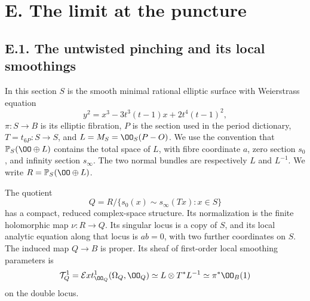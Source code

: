 \section{E. The limit at the puncture}
\subsection{E.1. The untwisted pinching and its local smoothings}

In this section $S$ is the smooth minimal rational elliptic surface with
Weierstrass equation
\[
 y^2=x^3-3t^3(t-1)x+2t^4(t-1)^2,
\]
$\pi:S\to B$ is its elliptic fibration, $P$ is the section used in the
period dictionary, $T=t_{6P}:S\to S$, and $L=M_S=\OO_S(P-O)$.
We use the convention that $\mathbb P_S(\OO\oplus L)$ contains the total
space of $L$, with fibre coordinate $a$, zero section $s_0$, and infinity
section $s_\infty$. The two normal bundles are respectively $L$ and
$L^{-1}$. We write $R=\mathbb P_S(\OO\oplus L)$.

\begin{proposition}\label{fam:src:E.1.1}\label{fam:st:E.1.1}
The quotient
\[
 Q=R/\{s_0(x)\sim s_\infty(Tx):x\in S\}
\]
has a compact, reduced complex-space structure. Its normalization is
the finite holomorphic map $\nu:R\to Q$. Its singular locus is a copy
of $S$, and its local analytic equation along that locus is $ab=0$,
with two further coordinates on $S$. The induced map $Q\to B$ is
proper. Its sheaf of first-order local smoothing parameters is
\[
 \mathcal T^1_Q=\mathcal Ext^1_{\OO_Q}(\Omega_Q,\OO_Q)
       \simeq L\otimes T^*L^{-1}\simeq\pi^*\OO_B(1)
\]
on the double locus.
\end{proposition}

